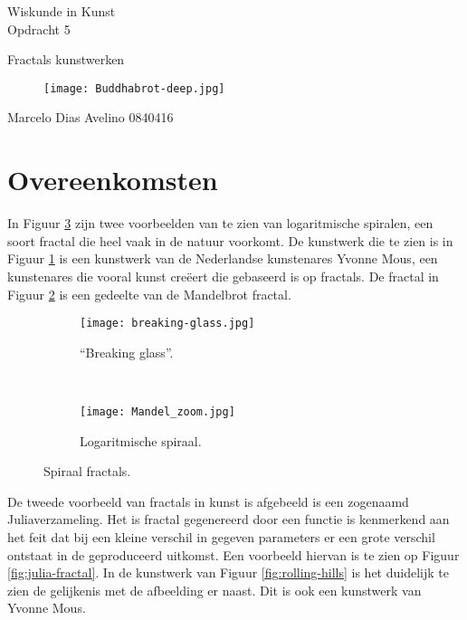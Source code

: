 \documentclass{article}
\begin{document}
\begin{center}
	\huge{Wiskunde in Kunst}\\
	\LARGE{Opdracht 5} \\
	
	\vspace{2cm}
	
	\Large{Fractals kunstwerken}\\
	
	\vfill
	
	\begin{figure}[Hh]
		\centering
		\texttt{[image: Buddhabrot-deep.jpg]}
	\end{figure}
	
	\vfill
	\Large{Marcelo Dias Avelino} \hfill \large{0840416}
\end{center}

\thispagestyle{empty} %

\pagebreak

\setcounter{page}{1} %

\section{Overeenkomsten}

In Figuur \ref{fig:spiral-fractal} zijn twee voorbeelden van te zien van logaritmische spiralen, een soort fractal die heel vaak in de natuur voorkomt. De kunstwerk die te zien is in Figuur \ref{fig:breaking-glass} is een kunstwerk van de Nederlandse kunstenares Yvonne Mous, een kunstenares die vooral kunst creëert die gebaseerd is op fractals. De fractal in Figuur \ref{fig:logarithm-spiral} is een gedeelte van de Mandelbrot fractal.

\begin{figure}[Hh]
    \centering
    \begin{subfigure}[b]{0.48\textwidth}
        \texttt{[image: breaking-glass.jpg]}
		\caption{``Breaking glass''.}
		\label{fig:breaking-glass}
    \end{subfigure}
    ~ 
    \begin{subfigure}[b]{0.48\textwidth}
        \texttt{[image: Mandel\_zoom.jpg]}
		\caption{Logaritmische spiraal.}
		\label{fig:logarithm-spiral}
    \end{subfigure}%
    \caption{Spiraal fractals.}
    \label{fig:spiral-fractal}
\end{figure}

De tweede voorbeeld van fractals in kunst is afgebeeld is een zogenaamd Juliaverzameling. Het is fractal gegenereerd door een functie is kenmerkend aan het feit dat bij een kleine verschil in gegeven parameters er een grote verschil ontstaat in de geproduceerd uitkomst. Een voorbeeld hiervan is te zien op Figuur \ref{fig:julia-fractal}. In de kunstwerk van Figuur \ref{fig:rolling-hills} is het duidelijk te zien de gelijkenis met de afbeelding er naast. Dit is ook een kunstwerk van Yvonne Mous.
\end{document}
